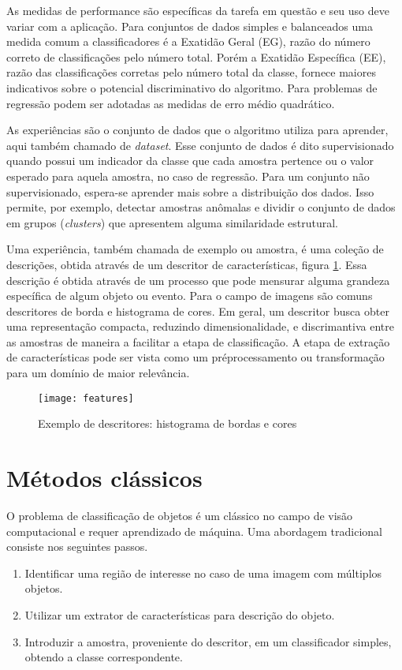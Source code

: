 As medidas de performance são específicas da tarefa em questão e seu uso deve variar com a aplicação. Para conjuntos de dados simples e balanceados uma medida comum a classificadores é a Exatidão Geral (EG), razão do número correto de classificações pelo número total. Porém a Exatidão Específica (EE), razão das classificações corretas pelo número total da classe, fornece maiores indicativos sobre o potencial discriminativo do algoritmo. Para problemas de regressão podem ser adotadas as medidas de erro médio quadrático.

As experiências são o conjunto de dados que o algoritmo utiliza para aprender, aqui também chamado de \textit{dataset}. Esse conjunto de dados é dito supervisionado quando possui um indicador da classe que cada amostra pertence ou o valor esperado para aquela amostra, no caso de regressão. Para um conjunto não supervisionado, espera-se aprender mais sobre a distribuição dos dados. Isso permite, por exemplo, detectar amostras anômalas e dividir o conjunto de dados em grupos (\textit{clusters}) que apresentem alguma similaridade estrutural.

Uma experiência, também chamada de exemplo ou amostra, é uma coleção de descrições, obtida através de um descritor de características, figura \ref{fig:features}. Essa descrição é obtida através de um processo que pode mensurar alguma grandeza específica de algum objeto ou evento. Para o campo de imagens são comuns descritores de borda e histograma de cores. Em geral, um descritor busca obter uma representação compacta, reduzindo dimensionalidade, e discrimantiva entre as amostras de maneira a facilitar a etapa de classificação. A etapa de extração de características pode ser vista como um préprocessamento ou transformação para um domínio de maior relevância.

\begin{figure}[h]
\caption{Exemplo de descritores: histograma de bordas e cores}
\centering
\texttt{[image: features]}
\label{fig:features}
\end{figure}

\section{Métodos clássicos}
O problema de classificação de objetos é um clássico no campo de visão computacional e requer aprendizado de máquina. Uma abordagem tradicional consiste nos seguintes passos.
	\begin{enumerate}
	\item Identificar uma região de interesse no caso de uma imagem com múltiplos objetos.
	\item Utilizar um extrator de características para descrição do objeto.
	\item Introduzir a amostra, proveniente do descritor, em um classificador simples, obtendo a classe correspondente.
	\end{enumerate}

